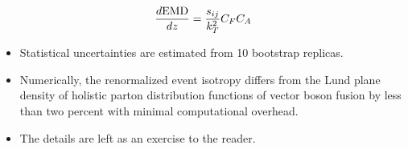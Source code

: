 \begin{equation}
  \frac{d \mathrm{EMD}}{d z} = \frac{s_{ij}}{k_T^2} C_F C_A
  \label{eq:5}
\end{equation}

\begin{itemize}
  \item Statistical uncertainties are estimated from 10 bootstrap replicas.
  \item Numerically, the renormalized event isotropy differs from the Lund plane density of holistic parton distribution functions of vector boson fusion by less than two percent with minimal computational overhead.
  \item The details are left as an exercise to the reader.
\end{itemize}


